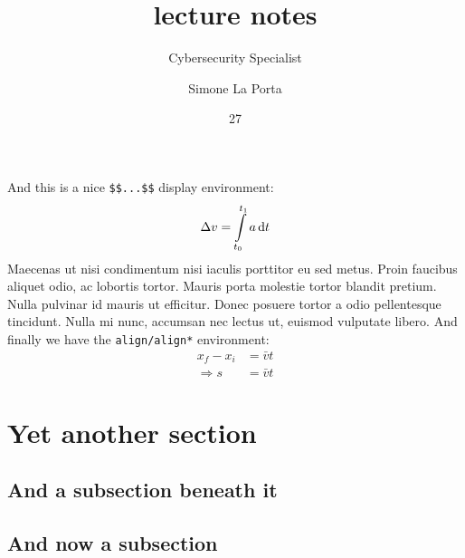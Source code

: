 \documentclass[english,course]{lecture}
\title{lecture notes}
\subtitle{Cybersecurity Specialist}
\author{Simone La Porta}
\date{27}{05}{2024}
\begin{document}












And this is a nice \texttt{\$\$...\$\$} display environment:
$$
\Delta v = \int\displaylimits_{t_0}^{t_1} a \, \textrm{d}t
$$
Maecenas ut nisi condimentum nisi iaculis porttitor eu sed metus. Proin faucibus aliquet odio, ac lobortis tortor. Mauris porta molestie tortor blandit pretium. Nulla pulvinar id mauris ut efficitur. Donec posuere tortor a odio pellentesque tincidunt. Nulla mi nunc, accumsan nec lectus ut, euismod vulputate libero.
%
And finally we have the \texttt{align/align*} environment:
\begin{align}
x_f - x_i &= \bar{v}t \nonumber\\
\Rightarrow s &= \bar{v}t
\end{align}
%
\section{Yet another section}
\subsection{And a subsection beneath it}
%
\subsection{And now a subsection}
\end{document}
